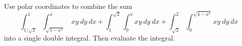\documentclass[12pt]{exam}
\begin{document}
\begin{questions}
\question Use polar coordinates to combine the sum
\[
        \int_{1/\sqrt{2}}^{1}\int_{\sqrt{1-x^2}}^{x}~xy~dy~dx + \int_1^{\sqrt{2}}\int_0^x xy~dy~dx+\int_{\sqrt{2}}^{2}\int_0^{\sqrt{4-x^2}}xy~dy~dx
\] into a single double integral. Then evaluate the integral.
\ifprintanswers
        \begin{solution}
            \begin{center}
                \begin{tikzpi}
            \end{center}
        \end{solution}
    \else
        \vfill
    \fi







\end{questions}
\end{document}
